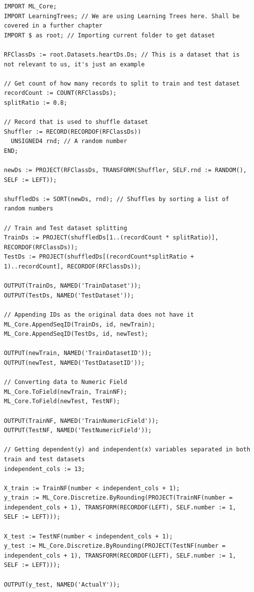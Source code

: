 \begin{lstlisting}
IMPORT ML_Core;
IMPORT LearningTrees; // We are using Learning Trees here. Shall be covered in a further chapter
IMPORT $ as root; // Importing current folder to get dataset

RFClassDs := root.Datasets.heartDs.Ds; // This is a dataset that is not relevant to us, it's just an example

// Get count of how many records to split to train and test dataset
recordCount := COUNT(RFClassDs);
splitRatio := 0.8;

// Record that is used to shuffle dataset
Shuffler := RECORD(RECORDOF(RFClassDs))
  UNSIGNED4 rnd; // A random number
END;

newDs := PROJECT(RFClassDs, TRANSFORM(Shuffler, SELF.rnd := RANDOM(), SELF := LEFT)); 

shuffledDs := SORT(newDs, rnd); // Shuffles by sorting a list of random numbers

// Train and Test dataset splitting
TrainDs := PROJECT(shuffledDs[1..(recordCount * splitRatio)], RECORDOF(RFClassDs));
TestDs := PROJECT(shuffledDs[(recordCount*splitRatio + 1)..recordCount], RECORDOF(RFClassDs));

OUTPUT(TrainDs, NAMED('TrainDataset'));
OUTPUT(TestDs, NAMED('TestDataset'));

// Appending IDs as the original data does not have it
ML_Core.AppendSeqID(TrainDs, id, newTrain);
ML_Core.AppendSeqID(TestDs, id, newTest);

OUTPUT(newTrain, NAMED('TrainDatasetID'));
OUTPUT(newTest, NAMED('TestDatasetID'));

// Converting data to Numeric Field
ML_Core.ToField(newTrain, TrainNF);
ML_Core.ToField(newTest, TestNF);

OUTPUT(TrainNF, NAMED('TrainNumericField'));
OUTPUT(TestNF, NAMED('TestNumericField'));

// Getting dependent(y) and independent(x) variables separated in both train and test datasets
independent_cols := 13;

X_train := TrainNF(number < independent_cols + 1);
y_train := ML_Core.Discretize.ByRounding(PROJECT(TrainNF(number = independent_cols + 1), TRANSFORM(RECORDOF(LEFT), SELF.number := 1, SELF := LEFT)));

X_test := TestNF(number < independent_cols + 1);
y_test := ML_Core.Discretize.ByRounding(PROJECT(TestNF(number = independent_cols + 1), TRANSFORM(RECORDOF(LEFT), SELF.number := 1, SELF := LEFT)));

OUTPUT(y_test, NAMED('ActualY'));


\end{lstlisting}
